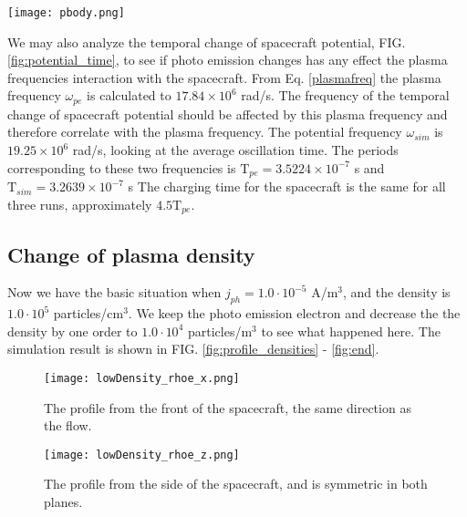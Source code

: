 \documentclass[aip, 
rsi, 
amsmath,
amssymb,
longbibliography,
reprint]{revtex4-1}
\begin{document}
\begin{figure*}
\texttt{[image: pbody.png]}
\caption{A graph of the mean spacecraft potential over time. Data show a simulation with no photo emission, and two simulations with photo emission from backside of the spacecraft, e.g. the wake side, in the opposite direction as the static plasma flow. We here refer to the photo emission as $j_{ph}$, given in  A/m$^3$. The simulation in red has the highest photo emission value, and the lines are in decreasing order to the one without. We also see that simulation with or without have similar oscillations. \label{fig:potential_time}}
\end{figure*}

We may also analyze the temporal change of spacecraft potential, FIG. \ref{fig:potential_time}, to see if photo emission changes has any effect the plasma frequencies interaction with the spacecraft.  From Eq. \ref{plasmafreq} the plasma frequency $\omega_{pe}$ is calculated to $17.84 \times 10^6$ rad/s. The frequency of the temporal change of spacecraft potential should be affected by this plasma frequency and therefore correlate with the plasma frequency. The potential frequency $\omega_{sim}$ is $19.25 \times 10^6$ rad/s, looking at the average oscillation time. The periods corresponding to these two frequencies is $\mathrm{T}_{pe} = 3.5224 \times 10^{-7}$ s and $\mathrm{T}_{sim} = 3.2639 \times 10^{-7}$ s The charging time for the spacecraft is the same for all three runs, approximately $4.5\mathrm{T}_{pe}$.

\subsection{Change of plasma density}

Now we have the basic situation when $j_{ph}= 1.0\cdot10^{-5}$ A/m$^3$, and the density is $1.0\cdot10^5$ particles/cm$^3$. We keep the photo emission electron and decrease the the density by one order to $1.0\cdot10^4$ particles/m$^3$ to see what happened here. The simulation result is shown in FIG. \ref{fig:profile_densities} - \ref{fig:end}.\\

\begin{figure*}
\begin{subfigure}{0.45\textwidth}
\texttt{[image: lowDensity\_rhoe\_x.png]}
\caption{The profile from the front of the spacecraft, the same direction as the flow.}
\end{subfigure}
\begin{subfigure}{0.45\textwidth}
\texttt{[image: lowDensity\_rhoe\_z.png]}
\caption{The profile from the side of the spacecraft, and is symmetric in both planes.}
\end{subfigure}
\caption{The electron density(the rhoe notation is used) distribution pictures: the situation when the density is lowed by an order of 1 from FIG \ref{fig:densityCurrentRelation}  and the photo-emission is $j_{ph} = 10^{-5}$ A/m$^3$} \label{fig:profile_densities}
\end{figure*}
\end{document}

